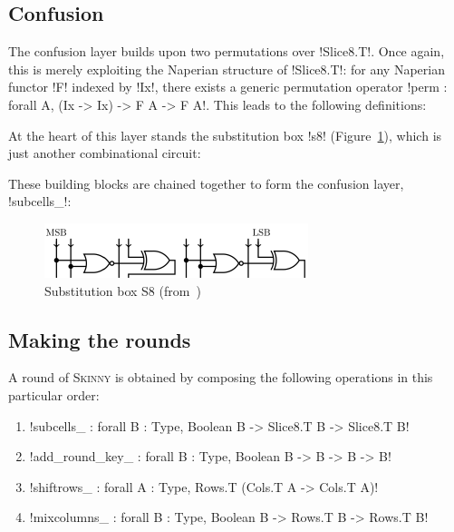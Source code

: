 \documentclass[draft,english]{jflart}
\newcommand{\Skinny}{\textsc{Skinny}}
\begin{document}
\subsection{Confusion}


The confusion layer builds upon two permutations over \coqe!Slice8.T!.
Once again, this is merely exploiting the Naperian structure of
\coqe!Slice8.T!: for any Naperian functor \coqe!F! indexed by
\coqe!Ix!, there exists a generic permutation operator
%
\coqe!perm : forall A, (Ix -> Ix) -> F A -> F A!.
%
This leads to the following definitions:
%


At the heart of this layer stands the substitution box \coqe!s8!
(Figure~\ref{fig:s8}), which is just another combinational circuit:
%

These building blocks are chained together to form the confusion
layer, \coqe!subcells_!:
%

\begin{figure}
  \centering
  \includegraphics[draft=false,width=.75\textwidth]{s8}
  \caption{Substitution box S8 (from~\citet{beierle:skinny})}
  \label{fig:s8}
\end{figure}

\subsection{Making the rounds}
\label{sec:assembling}


A round of \Skinny{} is obtained by composing the following operations in
this particular order:
%
\begin{enumerate}
\item \coqe!subcells_ : forall {B : Type}, Boolean B -> Slice8.T B -> Slice8.T B!
\item \coqe!add_round_key_ : forall {B : Type}, Boolean B -> B -> B -> B!
\item \coqe!shiftrows_ : forall {A : Type}, Rows.T (Cols.T A -> Cols.T A)!
\item \coqe!mixcolumns_ : forall {B : Type}, Boolean B -> Rows.T B -> Rows.T B!
\end{enumerate}
\end{document}
